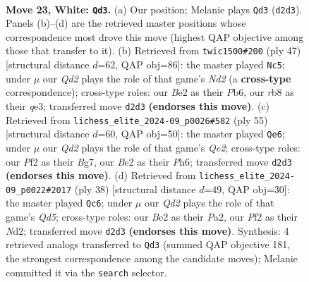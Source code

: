 \documentclass[11pt]{article}
\begin{document}
\clearpage

\begin{figure}[p]\centering
\begin{subfigure}{0.46\textwidth}\centering
\resizebox{\linewidth}{!}{%
\newchessgame
\chessboard[
  setfen={1r2q1k1/p1pp2pp/5p2/6n1/1pPP4/8/P1PQBP1P/1R4K1 w - - 0 23},
  showmover=false,
  pgfstyle=straightmove, color=movearrow, markmove={d2-d3}
]}
\caption{}
\end{subfigure}\hfill
\begin{subfigure}{0.46\textwidth}\centering
\resizebox{\linewidth}{!}{%
\newchessgame
\chessboard[
  setfen={4r1k1/p1qn1pp1/1p5p/4P3/3N1P2/4Q3/P5PP/3R2K1 b - - 3 24},
  showmover=false,
  pgfstyle=straightmove, color=movearrow, markmove={d7-c5}
]}
\caption{}
\end{subfigure}
\\[4pt]
\begin{subfigure}{0.46\textwidth}\centering
\resizebox{\linewidth}{!}{%
\newchessgame
\chessboard[
  setfen={2r3k1/4qpb1/p6p/6p1/1PP5/P3BP1P/2Q2P2/3R2K1 b - - 2 28},
  showmover=false,
  pgfstyle=straightmove, color=movearrow, markmove={e7-e6}
]}
\caption{}
\end{subfigure}\hfill
\begin{subfigure}{0.46\textwidth}\centering
\resizebox{\linewidth}{!}{%
\newchessgame
\chessboard[
  setfen={2r1q1k1/2pn1ppp/1p6/pP1Q4/3P4/6P1/P2N1P1P/2R2K2 w - - 1 20},
  showmover=false,
  pgfstyle=straightmove, color=movearrow, markmove={d5-c6}
]}
\caption{}
\end{subfigure}
\caption{\textbf{Move 23, White: \texttt{Qd3}.} (a) Our position; Melanie plays \texttt{Qd3} (\texttt{d2d3}). Panels (b)--(d) are the retrieved master positions whose correspondence most drove this move (highest QAP objective among those that transfer to it). (b) Retrieved from \texttt{twic1500\#200} (ply 47) [structural distance $d$=62, QAP obj=86]: the master played \texttt{Nc5}; under $\mu$ our \emph{Qd2} plays the role of that game's \emph{Nd2} (a \textbf{cross-type} correspondence); cross-type roles: our \emph{B}e2 as their \emph{P}b6, our \emph{r}b8 as their \emph{q}e3; transferred move \texttt{d2d3} \textbf{(endorses this move)}. (c) Retrieved from \texttt{lichess\_elite\_2024-09\_p0026\#582} (ply 55) [structural distance $d$=60, QAP obj=50]: the master played \texttt{Qe6}; under $\mu$ our \emph{Qd2} plays the role of that game's \emph{Qe2}; cross-type roles: our \emph{P}f2 as their \emph{B}g7, our \emph{B}e2 as their \emph{P}h6; transferred move \texttt{d2d3} \textbf{(endorses this move)}. (d) Retrieved from \texttt{lichess\_elite\_2024-09\_p0022\#2017} (ply 38) [structural distance $d$=49, QAP obj=30]: the master played \texttt{Qc6}; under $\mu$ our \emph{Qd2} plays the role of that game's \emph{Qd5}; cross-type roles: our \emph{B}e2 as their \emph{P}a2, our \emph{P}f2 as their \emph{N}d2; transferred move \texttt{d2d3} \textbf{(endorses this move)}. Synthesis: 4 retrieved analogs transferred to \texttt{Qd3} (summed QAP objective 181, the strongest correspondence among the candidate moves); Melanie committed it via the \texttt{search} selector.}
\label{fig:thought-m44}
\end{figure}
\end{document}
